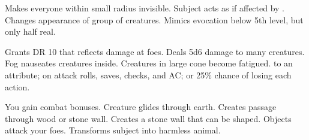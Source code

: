 \begin{swspelllist}
   Makes everyone within small radius invisible.
   Subject acts as if affected by .
   Changes appearance of group of creatures.
   Mimics evocation below 5th level, but only half real.

   Grants DR 10 that reflects damage at foes.
   Deals 5d6 damage to many creatures.
   Fog nauseates creatures inside.
   Creatures in large cone become fatigued.
    to an attribute;  on attack rolls, saves, checks, and AC; or 25\% chance of losing each action.
  \spellheadrestricted{}

  \M You gain combat bonuses.
   Creature glides through earth. 
   Creates passage through wood or stone wall.
   Creates a stone wall that can be shaped.
   Objects attack your foes.
   Transforms subject into harmless animal.
\end{swspelllist}

